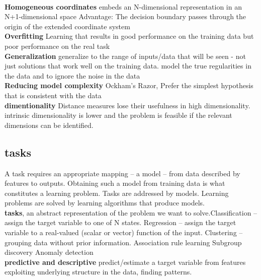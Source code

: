 \documentclass[cheatsheet.tex]{subfiles}
\begin{document}
\\
\textbf{Homogeneous coordinates} embeds an N-dimensional representation in an N+1-dimensional space Advantage: The decision boundary passes through the origin of the extended coordinate system
\\
\textbf{Overfitting} Learning that results in good performance on the training data but poor performance on the real task
\\
\textbf{Generalization} generalize to the range of inputs/data that will be seen - not just solutions that work well on the training data. model the true regularities in the data and to ignore the noise in the data
\\
\textbf{Reducing model complexity} Ockham's Razor, Prefer the simplest hypothesis that is consistent with the data
\\
\textbf{dimentionality} Distance measures lose their usefulness in high dimensionality. intrinsic dimensionality is lower and the problem is feasible if the relevant dimensions can be identified. 
\\
\subsection{tasks}
A task requires an appropriate mapping -- a model -- from data described by features to outputs. Obtaining such a model from training data is what constitutes a learning problem. Tasks are addressed by models. Learning problems are solved by learning algorithms that produce
models.
\\
\textbf{tasks}, an abstract representation of the problem we want to solve.\textbullet Classification -- assign the target variable to one of N states. \textbullet Regression -- assign the target variable to a real-valued (scalar or vector) function of the input. \textbullet Clustering -- grouping data without prior information. \textbullet Association rule learning \textbullet Subgroup discovery \textbullet Anomaly detection 
\\
\textbf{predictive and descriptive} \textbullet predict/estimate a target variable from features \textbullet  exploiting underlying structure in the data, finding patterns. 
\end{document}
